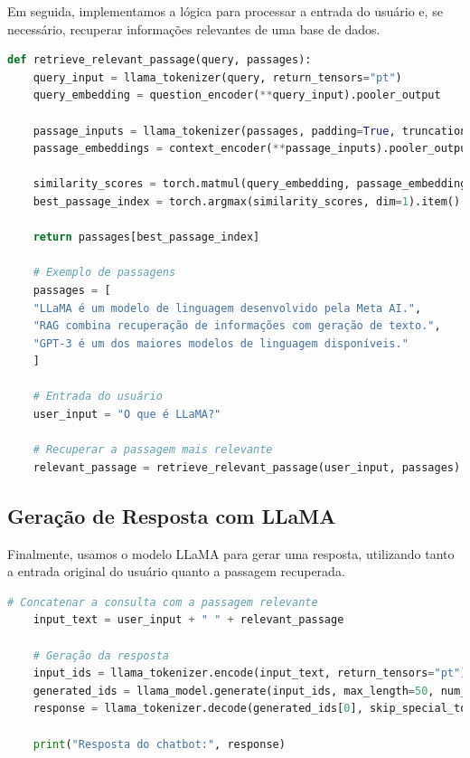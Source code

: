 \documentclass[14pt,a4paper,oneside]{book}
\begin{document}
Em seguida, implementamos a lógica para processar a entrada do usuário e, se necessário, recuperar informações relevantes de uma base de dados.

\begin{lstlisting}[language=Python]
	def retrieve_relevant_passage(query, passages):
	query_input = llama_tokenizer(query, return_tensors="pt")
	query_embedding = question_encoder(**query_input).pooler_output
	
	passage_inputs = llama_tokenizer(passages, padding=True, truncation=True, return_tensors="pt")
	passage_embeddings = context_encoder(**passage_inputs).pooler_output
	
	similarity_scores = torch.matmul(query_embedding, passage_embeddings.T)
	best_passage_index = torch.argmax(similarity_scores, dim=1).item()
	
	return passages[best_passage_index]
	
	# Exemplo de passagens
	passages = [
	"LLaMA é um modelo de linguagem desenvolvido pela Meta AI.",
	"RAG combina recuperação de informações com geração de texto.",
	"GPT-3 é um dos maiores modelos de linguagem disponíveis."
	]
	
	# Entrada do usuário
	user_input = "O que é LLaMA?"
	
	# Recuperar a passagem mais relevante
	relevant_passage = retrieve_relevant_passage(user_input, passages)
\end{lstlisting}

\subsection{Geração de Resposta com LLaMA}

Finalmente, usamos o modelo LLaMA para gerar uma resposta, utilizando tanto a entrada original do usuário quanto a passagem recuperada.

\begin{lstlisting}[language=Python]
	# Concatenar a consulta com a passagem relevante
	input_text = user_input + " " + relevant_passage
	
	# Geração da resposta
	input_ids = llama_tokenizer.encode(input_text, return_tensors="pt")
	generated_ids = llama_model.generate(input_ids, max_length=50, num_beams=5, early_stopping=True)
	response = llama_tokenizer.decode(generated_ids[0], skip_special_tokens=True)
	
	print("Resposta do chatbot:", response)
\end{lstlisting}
\end{document}
